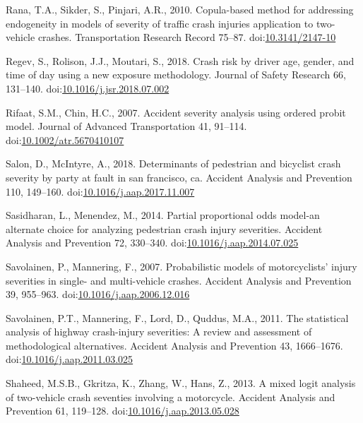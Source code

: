 \documentclass[]{elsarticle} %
\begin{document}
\leavevmode\hypertarget{ref-Rana2010copula}{}%
Rana, T.A., Sikder, S., Pinjari, A.R., 2010. Copula-based method for
addressing endogeneity in models of severity of traffic crash injuries
application to two-vehicle crashes. Transportation Research Record
75--87. doi:\href{https://doi.org/10.3141/2147-10}{10.3141/2147-10}

\leavevmode\hypertarget{ref-Regev2018crash}{}%
Regev, S., Rolison, J.J., Moutari, S., 2018. Crash risk by driver age,
gender, and time of day using a new exposure methodology. Journal of
Safety Research 66, 131--140.
doi:\href{https://doi.org/10.1016/j.jsr.2018.07.002}{10.1016/j.jsr.2018.07.002}

\leavevmode\hypertarget{ref-Rifaat2007accident}{}%
Rifaat, S.M., Chin, H.C., 2007. Accident severity analysis using ordered
probit model. Journal of Advanced Transportation 41, 91--114.
doi:\href{https://doi.org/10.1002/atr.5670410107}{10.1002/atr.5670410107}

\leavevmode\hypertarget{ref-Salon2018determinants}{}%
Salon, D., McIntyre, A., 2018. Determinants of pedestrian and bicyclist
crash severity by party at fault in san francisco, ca. Accident Analysis
and Prevention 110, 149--160.
doi:\href{https://doi.org/10.1016/j.aap.2017.11.007}{10.1016/j.aap.2017.11.007}

\leavevmode\hypertarget{ref-Sasidharan2014partial}{}%
Sasidharan, L., Menendez, M., 2014. Partial proportional odds model-an
alternate choice for analyzing pedestrian crash injury severities.
Accident Analysis and Prevention 72, 330--340.
doi:\href{https://doi.org/10.1016/j.aap.2014.07.025}{10.1016/j.aap.2014.07.025}

\leavevmode\hypertarget{ref-Savolainen2007probabilistic}{}%
Savolainen, P., Mannering, F., 2007. Probabilistic models of
motorcyclists' injury severities in single- and multi-vehicle crashes.
Accident Analysis and Prevention 39, 955--963.
doi:\href{https://doi.org/10.1016/j.aap.2006.12.016}{10.1016/j.aap.2006.12.016}

\leavevmode\hypertarget{ref-Savolainen2011statistical}{}%
Savolainen, P.T., Mannering, F., Lord, D., Quddus, M.A., 2011. The
statistical analysis of highway crash-injury severities: A review and
assessment of methodological alternatives. Accident Analysis and
Prevention 43, 1666--1676.
doi:\href{https://doi.org/10.1016/j.aap.2011.03.025}{10.1016/j.aap.2011.03.025}

\leavevmode\hypertarget{ref-Shaheed2013mixed}{}%
Shaheed, M.S.B., Gkritza, K., Zhang, W., Hans, Z., 2013. A mixed logit
analysis of two-vehicle crash seventies involving a motorcycle. Accident
Analysis and Prevention 61, 119--128.
doi:\href{https://doi.org/10.1016/j.aap.2013.05.028}{10.1016/j.aap.2013.05.028}
\end{document}
